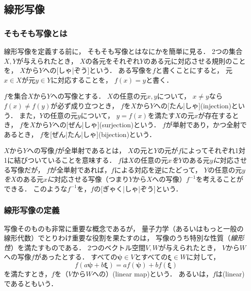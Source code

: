 \documentclass[
]{sotsu}
\newcommand{\bpsi}{\symbf{\psi}}
\newcommand{\bxi}{\symbf{\xi}}
\newcommand{\fire}[1]{\textcolor{fire}{#1}}
\newcommand{\water}[1]{\textcolor{water}{#1}}
\begin{document}
\subsection{線形写像}

\subsubsection{そもそも写像とは}

\quad
線形写像を定義する前に，
そもそも写像とはなにかを簡単に見る．
2つの集合$X, Y$が与えられたとき，
$X$の各元をそれぞれ$Y$のある元に対応させる規則のことを，
$X$から$Y$への[しゃ|ぞう]という．
ある写像を$f$と書くことにすると，
元$x \in X$が元$y \in Y$に対応することを，
$f(x) = y$と書く．

$f$を集合$X$から$Y$への写像とする．
$X$の任意の元$x, y$について，
$x \neq y$なら$f(x) \neq f(y)$が必ず成り立つとき，
$f$を$X$から$Y$への[たん|しゃ](injection)という．
また，$Y$の任意の元$y$について，
$y = f(x)$を満たす$X$の元$x$が存在するとき，
$f$を$X$から$Y$への[ぜん|しゃ](surjection)という．
$f$が単射であり，かつ全射であるとき，
$f$を[ぜん|たん|しゃ](bijection)という．

$X$から$Y$への写像$f$が全単射であるとは，
$X$の元と$Y$の元が$f$によってそれぞれ1対1に結びついていることを意味する．
$f$は\fire{$X$の任意の元$x$\emph{を}}\water{$Y$のある元$y$\emph{に}}対応させる写像だが，
$f$が全単射であれば，$f$による対応を逆にたどって，
\water{$Y$の任意の元$y$\emph{を}}\fire{$X$のある元$x$\emph{に}}対応させる写像（つまり$Y$から$X$への写像）$f^{-1}$を考えることができる．
このような$f^{-1}$を，$f$の[ぎゃく|しゃ|ぞう]という．


\subsubsection{線形写像の定義}

写像そのものも非常に重要な概念であるが，
量子力学（あるいはもっと一般の線形代数）でとりわけ重要な役割を果たすのは，
写像のうち特別な性質（\emph{線形性}）を満たすものである．
2つのベクトル空間$V, W$が与えられたとき，
$V$から$W$への写像$f$があったとする．
すべての$\bpsi \in V$とすべての$\bxi \in W$に対して，
\begin{equation}
    \label{eq:linear-map}
    f(a \bpsi + b \bxi)
        = a f(\bpsi) + b f(\bxi)
\end{equation}
を満たすとき，$f$を（$V$から$W$への）(linear map)という．
あるいは，$f$は(linear)であるともいう．
\end{document}
